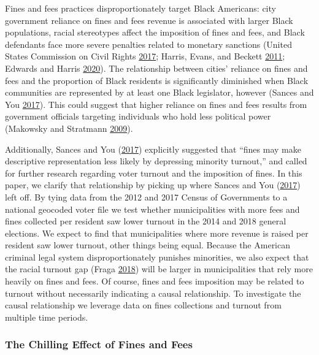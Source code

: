\documentclass[
  12pt,
]{article}
\begin{document}
Fines and fees practices disproportionately target Black Americans: city government reliance on fines and fees revenue is associated with larger Black populations, racial stereotypes affect the imposition of fines and fees, and Black defendants face more severe penalties related to monetary sanctions (United States Commission on Civil Rights \protect\hyperlink{ref-UnitedStatesCommissiononCivilRights2017}{2017}; Harris, Evans, and Beckett \protect\hyperlink{ref-Harris2011}{2011}; Edwards and Harris \protect\hyperlink{ref-Edwards2020}{2020}). The relationship between cities' reliance on fines and fees and the proportion of Black residents is significantly diminished when Black communities are represented by at least one Black legislator, however (Sances and You \protect\hyperlink{ref-Sances2017}{2017}). This could suggest that higher reliance on fines and fees results from government officials targeting individuals who hold less political power (Makowsky and Stratmann \protect\hyperlink{ref-Makowsky2009}{2009}).

Additionally, Sances and You (\protect\hyperlink{ref-Sances2017}{2017}) explicitly suggested that ``fines may make descriptive representation less likely by depressing minority turnout,'' and called for further research regarding voter turnout and the imposition of fines. In this paper, we clarify that relationship by picking up where Sances and You (\protect\hyperlink{ref-Sances2017}{2017}) left off. By tying data from the 2012 and 2017 Census of Governments to a national geocoded voter file we test whether municipalities with more fees and fines collected per resident saw lower turnout in the 2014 and 2018 general elections. We expect to find that municipalities where more revenue is raised per resident saw lower turnout, other things being equal. Because the American criminal legal system disproportionately punishes minorities, we also expect that the racial turnout gap (Fraga \protect\hyperlink{ref-Fraga2018}{2018}) will be larger in municipalities that rely more heavily on fines and fees. Of course, fines and fees imposition may be related to turnout without necessarily indicating a causal relationship. To investigate the causal relationship we leverage data on fines collections and turnout from multiple time periods.

\hypertarget{the-chilling-effect-of-fines-and-fees}{%
\subsubsection*{The Chilling Effect of Fines and Fees}\label{the-chilling-effect-of-fines-and-fees}}
\end{document}
